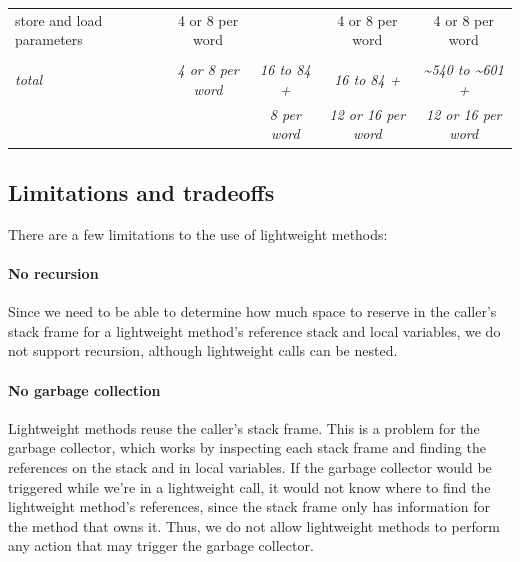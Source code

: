 \begin{table}
{\begin{tabular}{lccccc}
    store and load parameters                                 &                 & 4 or 8 per word         &                             & 4 or 8 per word             & 4 or 8 per word                                     \\
    \\
    \emph{total}                                              &                 & \emph{4 or 8 per word}  & \emph{16 to 84 +}           & \emph{16 to 84 +}           & \emph{\textasciitilde 540 to \textasciitilde 601 +} \\
                                                              &                 &                         & \emph{8 per word}           & \emph{12 or 16 per word}    & \emph{12 or 16 per word}                            \\
    \bottomrule
    \end{tabular}
    }
\end{table}


\subsection{Limitations and tradeoffs}
There are a few limitations to the use of lightweight methods:
\paragraph{No recursion} Since we need to be able to determine how much space to reserve in the caller's stack frame for a lightweight method's reference stack and local variables, we do not support recursion, although lightweight calls can be nested.

\paragraph{No garbage collection}
Lightweight methods reuse the caller's stack frame. This is a problem for the garbage collector, which works by inspecting each stack frame and finding the references on the stack and in local variables. If the garbage collector would be triggered while we're in a lightweight call, it would not know where to find the lightweight method's references, since the stack frame only has information for the method that owns it. Thus, we do not allow lightweight methods to perform any action that may trigger the garbage collector.

